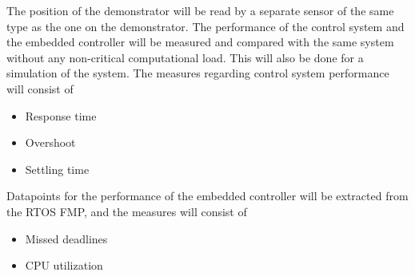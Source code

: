 The position of the demonstrator will be read by a separate sensor of the same type as the one on the demonstrator. The performance of the control system and the embedded controller will be measured and compared with the same system without any non-critical computational load. This will also be done for a simulation of the system. The measures regarding control system performance will consist of 
\begin{itemize}
\item Response time
\item Overshoot
\item Settling time %
\end{itemize}

Datapoints for the performance of the embedded controller will be extracted from the RTOS FMP, and the measures will consist of
\begin{itemize}
\item Missed deadlines
\item CPU utilization
\end{itemize}